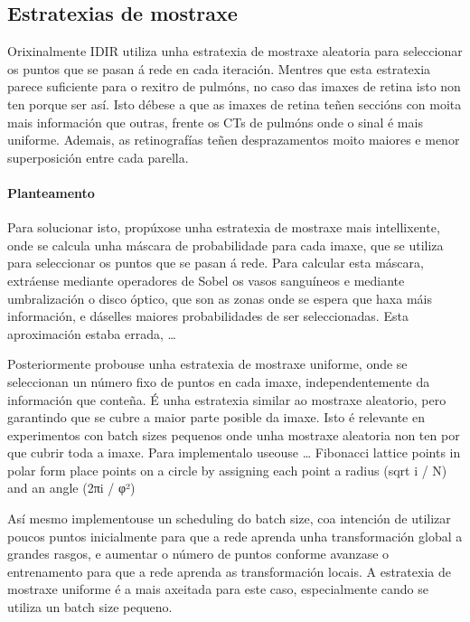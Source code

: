 \subsection{Estratexias de mostraxe}
\label{subsec:Estratexias de mostraxe}

Orixinalmente IDIR utiliza unha estratexia de mostraxe aleatoria para seleccionar os puntos que se pasan á rede en cada iteración.
Mentres que esta estratexia parece suficiente para o rexitro de pulmóns, no caso das imaxes de retina isto non ten porque ser así.
Isto débese a que as imaxes de retina teñen seccións con moita mais información que outras, frente os CTs de pulmóns onde o sinal é mais uniforme.
Ademais, as retinografías teñen desprazamentos moito maiores e menor superposición entre cada parella. 

\paragraph{Planteamento}
\label{par:Planteamento}

Para solucionar isto, propúxose unha estratexia de mostraxe mais intellixente, onde se calcula unha máscara de probabilidade para cada imaxe, que se utiliza para seleccionar os puntos que se pasan á rede.
Para calcular esta máscara, extráense mediante operadores de Sobel os vasos sanguíneos e mediante umbralización o disco óptico, que son as zonas onde se espera que haxa máis información, e dáselles maiores probabilidades de ser seleccionadas.
Esta aproximación estaba errada, \dots

Posteriormente probouse unha estratexia de mostraxe uniforme, onde se seleccionan un número fixo de puntos en cada imaxe, independentemente da información que conteña.
É unha estratexia similar ao mostraxe aleatorio, pero garantindo que se cubre a maior parte posible da imaxe. Isto é relevante en experimentos con batch sizes pequenos onde unha mostraxe aleatoria non ten por que cubrir toda a imaxe.
Para implementalo useouse \dots 
Fibonacci lattice points in polar form place points on a circle by assigning each point a radius (sqrt i / N) and an angle (2πi / φ²)

Así mesmo implementouse un scheduling do batch size, coa intención de utilizar poucos puntos inicialmente para que a rede aprenda unha transformación global a grandes rasgos, e aumentar o número de puntos conforme avanzase o entrenamento para que a rede aprenda as transformación locais.
A estratexia de mostraxe uniforme é a mais axeitada para este caso, especialmente cando se utiliza un batch size pequeno.

